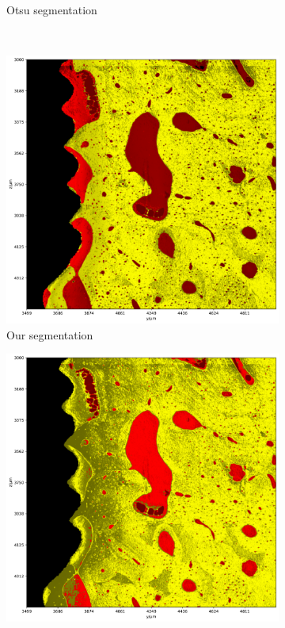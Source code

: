 \begin{figure}
\begin{subfigure}{0.5\textwidth}
      \caption{Otsu segmentation}
    \end{subfigure}
    \\
    \begin{subfigure}{0.5\textwidth}
      \centering
      \includegraphics[width=\linewidth]{generated/770c_pag_segmented_zy_colored.pdf}
      \caption{Our segmentation}
    \end{subfigure}%
    \begin{subfigure}{0.5\textwidth}
      \centering
      \includegraphics[width=\linewidth]{generated/770c_pag_global_zy.pdf}

\end{subfigure}
\end{figure}
